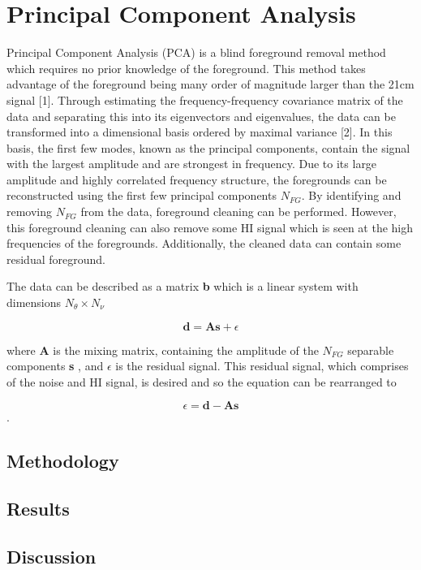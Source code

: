 \section{Principal Component Analysis}

Principal Component Analysis (PCA) is a blind foreground removal method which requires no prior knowledge of the foreground. This method takes advantage of the foreground being many order of magnitude larger than the 21cm signal [1]. Through estimating the frequency-frequency covariance matrix of the data and separating this into its eigenvectors and eigenvalues, the data can be transformed into a dimensional basis ordered by maximal variance [2]. In this basis, the first few modes, known as the principal components, contain the signal with the largest amplitude and are strongest in frequency. Due to its large amplitude and highly correlated frequency structure, the foregrounds can be reconstructed using the first few principal components $N_{FG}$. By identifying and removing $N_{FG}$ from the data, foreground cleaning can be performed. However, this foreground cleaning can also remove some HI signal which is seen at the high frequencies of the foregrounds. Additionally, the cleaned data can contain some residual foreground.

The data can be described as a matrix \textbf{b} which is a linear system with dimensions $N_\theta \times N_\nu$

\begin{equation}
    \textbf{d} = \textbf{As} + \epsilon
\end{equation}

where \textbf{A} is the mixing matrix, containing the amplitude of the $N_{FG}$ separable components \textbf{s} , and $\epsilon$ is the residual signal. This residual signal, which comprises of the noise and HI signal, is desired and so the equation can be rearranged to

\begin{equation}
    \epsilon = \textbf{d} - \textbf{As}
\end{equation}.

\subsection{Methodology}

\subsection{Results}

\subsection{Discussion}